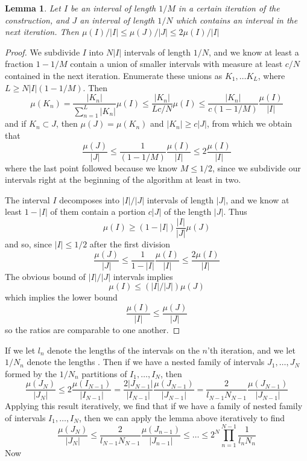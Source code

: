 \documentclass{report}
\theoremstyle{plain}
\newtheorem{lemma}{Lemma}
\theoremstyle{plain}
\begin{document}
\begin{lemma}
    Let $I$ be an interval of length $1/M$ in a certain iteration of the construction, and $J$ an interval of length $1/N$ which contains an interval in the next iteration. Then $\mu(I)/|I| \leq \mu(J)/|J| \leq 2 \mu(I)/|I|$
\end{lemma}
\begin{proof}
    We subdivide $I$ into $N |I|$ intervals of length $1/N$, and we know at least a fraction $1 - 1/M$ contain a union of smaller intervals with measure at least $c/N$ contained in the next iteration. Enumerate these unions as $K_1, \dots K_L$, where $L \geq N|I|(1 - 1/M)$. Then
    \[ \mu(K_n) = \frac{|K_n|}{\sum_{n = 1}^L |K_n|} \mu(I) \leq \frac{|K_n|}{Lc/N} \mu(I) \leq \frac{|K_n|}{c(1 - 1/M)} \frac{\mu(I)}{|I|} \]
    and if $K_n \subset J$, then $\mu(J) = \mu(K_n)$ and $|K_n| \geq c|J|$, from which we obtain that
    \[ \frac{\mu(J)}{|J|} \leq \frac{1}{(1 - 1/M)} \frac{\mu(I)}{|I|} \leq 2 \frac{\mu(I)}{|I|} \]
    where the last point followed because we know $M \leq 1/2$, since we subdivide our intervals right at the beginning of the algorithm at least in two.

    The interval $I$ decomposes into $|I|/|J|$ intervals of length $|J|$, and we know at least $1 - |I|$ of them contain a portion $c|J|$ of the length $|J|$. Thus
    \[ \mu(I) \geq (1 - |I|) \frac{|I|}{|J|} \mu(J) \]
    and so, since $|I| \leq 1/2$ after the first division
    \[ \frac{\mu(J)}{|J|} \leq \frac{1}{1 - |I|} \frac{\mu(I)}{|I|} \leq \frac{2 \mu(I)}{|I|} \]
    The obvious bound of $|I|/|J|$ intervals implies
    \[ \mu(I) \leq (|I|/|J|) \mu(J) \]
    which implies the lower bound
    \[ \frac{\mu(I)}{|I|} \leq \frac{\mu(J)}{|J|} \]
    so the ratios are comparable to one another.
\end{proof}

If we let $l_n$ denote the lengths of the intervals on the $n$'th iteration, and we let $1/N_n$ denote the lengths . Then if we have a nested family of intervals $J_1, \dots, J_N$ formed by the $1/N_n$ partitions of $I_1, \dots, I_N$, then
%
\[ \frac{\mu(J_N)}{|J_N|} \leq 2 \frac{\mu(I_{N-1})}{|I_{N-1}|} = \frac{2|J_{N-1}|}{|I_{N-1}|} \frac{\mu(J_{N-1})}{|J_{N-1}|} = \frac{2}{l_{N-1} N_{N-1}} \frac{\mu(J_{N-1})}{|J_{N-1}|} \]
%
Applying this result iteratively, we find that if we have a family of nested family of intervals $I_1, \dots, I_N$, then we can apply the lemma above iteratively to find
%
\[ \frac{\mu(J_N)}{|J_N|} \leq \frac{2}{l_{N-1} N_{N-1}} \frac{\mu(J_{n-1})}{|J_{n-1}|} \leq \dots \leq 2^N \prod_{n = 1}^{N-1} \frac{1}{l_nN_n} \]
%
Now
\end{document}
